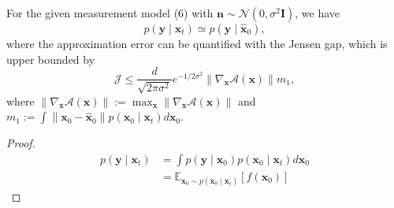 \begin{theorem}[定理1的证明]
    For the given measurement model (6) with $\boldsymbol{n} \sim \mathcal{N}\left(0, \sigma^2 \boldsymbol{I}\right)$, we have
\begin{equation}
  p\left(\boldsymbol{y} \mid \boldsymbol{x}_t\right) \simeq p\left(\boldsymbol{y} \mid \hat{\boldsymbol{x}}_0\right),  
\end{equation}
where the approximation error can be quantified with the Jensen gap, which is upper bounded by
\begin{equation}
    \mathcal{J} \leq \frac{d}{\sqrt{2 \pi \sigma^2}} e^{-1 / 2 \sigma^2}\left\|\nabla_{\boldsymbol{x}} \mathcal{A}(\boldsymbol{x})\right\| m_1,
\end{equation}
where $\left\|\nabla_{\boldsymbol{x}} \mathcal{A}(\boldsymbol{x})\right\|:=\max _{\boldsymbol{x}}\left\|\nabla_{\boldsymbol{x}} \mathcal{A}(\boldsymbol{x})\right\|$ and $m_1:=\int\left\|\boldsymbol{x}_0-\hat{\boldsymbol{x}}_0\right\| p\left(\boldsymbol{x}_0 \mid \boldsymbol{x}_t\right) d \boldsymbol{x}_0$.
\begin{proof}
 \begin{align}
p\left(\boldsymbol{y} \mid \boldsymbol{x}_t\right) & =\int p\left(\boldsymbol{y} \mid \boldsymbol{x}_0\right) p\left(\boldsymbol{x}_0 \mid \boldsymbol{x}_t\right) d \boldsymbol{x}_0 \\
& =\mathbb{E}_{\boldsymbol{x}_0 \sim p\left(\boldsymbol{x}_0 \mid \boldsymbol{x}_t\right)}\left[f\left(\boldsymbol{x}_0\right)\right]
\end{align}


\end{proof}
\end{theorem}
